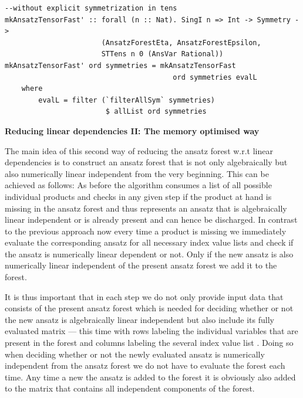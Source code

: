 \documentclass[a4paper,12pt, DIV=14, BCOR=5mm, twoside, headsepline]{scrbook}
\begin{document}
\begin{samepage}
\begin{verbatim}
--without explicit symmetrization in tens
mkAnsatzTensorFast' :: forall (n :: Nat). SingI n => Int -> Symmetry ->
                       (AnsatzForestEta, AnsatzForestEpsilon,
                       STTens n 0 (AnsVar Rational))
mkAnsatzTensorFast' ord symmetries = mkAnsatzTensorFast
                                        ord symmetries evalL
    where
        evalL = filter (`filterAllSym` symmetries) 
                        $ allList ord symmetries
\end{verbatim} 
\end{samepage}

\noindent \textbf{Reducing linear dependencies II:  The memory optimised way}

The main idea of this second way of reducing the ansatz forest w.r.t linear dependencies is to construct an ansatz forest that is not only algebraically but also numerically linear independent from the very beginning. This can be achieved as follows: As before the algorithm consumes a list of all possible individual products and checks in any given step if the product at hand is missing in the ansatz forest and thus represents an ansatz that is algebraically linear independent or is already present and can hence be discharged. In contrast to the previous approach now every time a product is missing we immediately evaluate the corresponding ansatz for all necessary index value lists and check if the ansatz is numerically linear dependent or not. Only if the new ansatz is also numerically linear independent of the present ansatz forest we add it to the forest.

It is thus important that in each step we do not only provide input data that consists of the present ansatz forest which is needed for deciding whether or not the new ansatz is algebraically linear independent but also include its fully evaluated matrix --- this time with rows labeling the individual variables that are present in the forest and columns labeling the several index value list
%
%
. Doing so when deciding whether or not the newly evaluated ansatz is numerically independent from the ansatz forest we do not have to evaluate the forest each time. Any time a  new the ansatz is added to the forest it is obviously also added to the matrix that contains all independent components of the forest.
\end{document}
